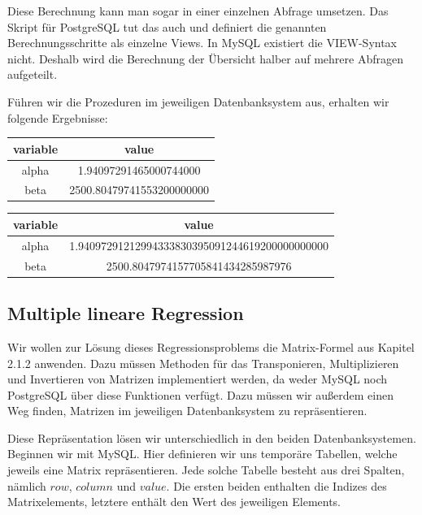 Diese Berechnung kann man sogar in einer einzelnen Abfrage umsetzen. Das Skript für PostgreSQL tut das auch und definiert die genannten Berechnungsschritte als einzelne Views. In MySQL existiert die VIEW-Syntax nicht. Deshalb wird die Berechnung der Übersicht halber auf mehrere Abfragen aufgeteilt.

Führen wir die Prozeduren im jeweiligen Datenbanksystem aus, erhalten wir folgende Ergebnisse:

\begin{center}
  \begin{tabular}{|c|c|}\hline
    \textbf{variable} & \textbf{value} \\ \hline
    alpha & 1.94097291465000744000 \\ \hline
    beta & 2500.80479741553200000000 \\ \hline
  \end{tabular}

  \begin{tabular}{|c|c|}\hline
    \textbf{variable} & \textbf{value} \\ \hline
    alpha & 1.94097291212994333830395091244619200000000000 \\ \hline
    beta & 2500.8047974157705841434285987976 \\ \hline
  \end{tabular}
\end{center}

\subsection{Multiple lineare Regression}

Wir wollen zur Lösung dieses Regressionsproblems die Matrix-Formel aus Kapitel 2.1.2 anwenden. Dazu müssen Methoden für das Transponieren, Multiplizieren und Invertieren von Matrizen implementiert werden, da weder MySQL noch PostgreSQL über diese Funktionen verfügt. Dazu müssen wir außerdem einen Weg finden, Matrizen im jeweiligen Datenbanksystem zu repräsentieren.

Diese Repräsentation lösen wir unterschiedlich in den beiden Datenbanksystemen. Beginnen wir mit MySQL. Hier definieren wir uns temporäre Tabellen, welche jeweils eine Matrix repräsentieren. Jede solche Tabelle besteht aus drei Spalten, nämlich $row$, $column$ und $value$. Die ersten beiden enthalten die Indizes des Matrixelements, letztere enthält den Wert des jeweiligen Elements.

